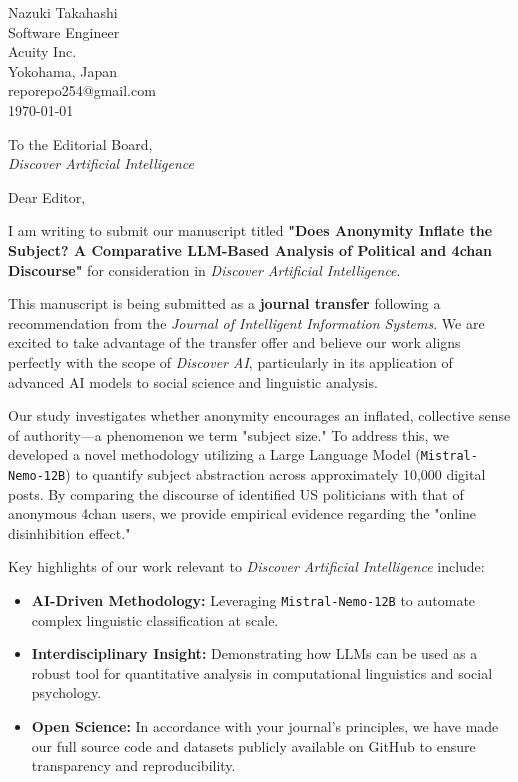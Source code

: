 \documentclass[12pt]{article}
\makeatletter
\newcommand{\sendername}{Nazuki Takahashi}
\newcommand{\senderpos}{Software Engineer}
\newcommand{\senderinst}{Acuity Inc.}
\newcommand{\senderaddress}{Yokohama, Japan}
\newcommand{\senderemail}{reporepo254@gmail.com}
\makeatother
\begin{document}
\begin{flushleft}
    \sendername \\
    \senderpos \\
    \senderinst \\
    \senderaddress \\
    \senderemail \\
    \today
\end{flushleft}

\vspace{1em}

\begin{flushleft}
    To the Editorial Board, \\
    \textit{Discover Artificial Intelligence}
\end{flushleft}

\vspace{1.5em}

\noindent Dear Editor,

\vspace{1em}

I am writing to submit our manuscript titled \textbf{"Does Anonymity Inflate the Subject? A Comparative LLM-Based Analysis of Political and 4chan Discourse"} for consideration in \textit{Discover Artificial Intelligence}. 

This manuscript is being submitted as a \textbf{journal transfer} following a recommendation from the \textit{Journal of Intelligent Information Systems}. We are excited to take advantage of the transfer offer and believe our work aligns perfectly with the scope of \textit{Discover AI}, particularly in its application of advanced AI models to social science and linguistic analysis.

Our study investigates whether anonymity encourages an inflated, collective sense of authority—a phenomenon we term "subject size." To address this, we developed a novel methodology utilizing a Large Language Model (\texttt{Mistral-Nemo-12B}) to quantify subject abstraction across approximately 10,000 digital posts. By comparing the discourse of identified US politicians with that of anonymous 4chan users, we provide empirical evidence regarding the "online disinhibition effect."

Key highlights of our work relevant to \textit{Discover Artificial Intelligence} include:
\begin{itemize}
    \item \textbf{AI-Driven Methodology:} Leveraging \texttt{Mistral-Nemo-12B} to automate complex linguistic classification at scale.
    \item \textbf{Interdisciplinary Insight:} Demonstrating how LLMs can be used as a robust tool for quantitative analysis in computational linguistics and social psychology.
    \item \textbf{Open Science:} In accordance with your journal's principles, we have made our full source code and datasets publicly available on GitHub to ensure transparency and reproducibility.
\end{itemize}
\end{document}
